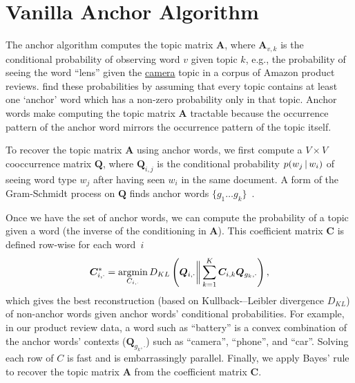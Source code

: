 \section{Vanilla Anchor Algorithm}
\label{sec:vanilla-algo}

The anchor algorithm computes the topic matrix $\bm{A}$,
where $\bm{A}_{v,k}$ is the conditional probability of observing word $v$ given
topic $k$, e.g., the probability of seeing the word ``lens'' given the
\underline{camera} topic in a corpus of Amazon product reviews.
 find these probabilities by assuming that every topic
contains at least one `anchor' word which has a non-zero probability only in
that topic.
Anchor words make computing the topic matrix $\bm{A}$ tractable because the
occurrence pattern of the anchor word mirrors the occurrence pattern of the
topic itself.

To recover the topic matrix $\bm{A}$ using anchor words, we first compute a $V
\times V$ cooccurrence matrix $\bm{Q}$, where $\bm{Q}_{i,j}$ is the conditional
probability $p(w_j \, | \, w_i)$ of seeing word type $w_j$ after having seen $w_i$ in the
same document.
A form of the Gram-Schmidt process on $\bm{Q}$ finds anchor words $\{g_1 \dots
g_k\}$~\cite{anchors-practical}.

Once we have the set of anchor words, we can compute the probability of a topic
given a word (the inverse of the conditioning in $\bm{A}$).
This coefficient matrix $\bm{C}$ is defined row-wise for each word~$i$
\begin{equation}
\bm{C}^*_{i,\cdot} = \argmin_{C_{i,\cdot}} D_{KL} \left( \bm{Q}_{i,\cdot} \bigg\| \sum_{k=1}^K \bm{C}_{i,k} \bm{Q}_{g_k,\cdot} \right),
\label{eq:solve-c}
\end{equation}
which gives the best reconstruction (based on \mbox{Kullback-–Leibler}
divergence $D_{KL}$) of non-anchor words given anchor words' conditional probabilities.
For example, in our product review data, a word such as ``battery'' is a convex combination of the anchor words' contexts ($
\bm{Q}_{g_k,\cdot}$) such as ``camera'', ``phone'', and ``car''.
Solving each row of $C$ is fast and is embarrassingly parallel.
Finally, we apply Bayes' rule to recover the topic matrix $\bm{A}$ from the
coefficient matrix $\bm{C}$.


